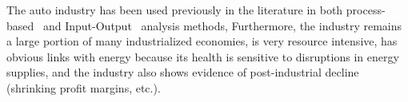 The auto industry has been used previously
in the literature in both 
process-based~\cite{Berry:1973vo, Sullivan1995, Stodolsky1995, 
							Sullivan1998, McCleese2002, Sullivan2010, Hawkins2012}
and Input-Output~\cite{Bullard:1978vd, MacLean1998, MacLean2003}
analysis methods,
Furthermore, the industry
remains a large portion of many industrialized economies, 
is very resource intensive, 
has obvious links with energy because
its health is sensitive to disruptions in energy supplies, and
the industry also shows evidence of 
post-industrial decline (shrinking profit margins, etc.).







%
%


